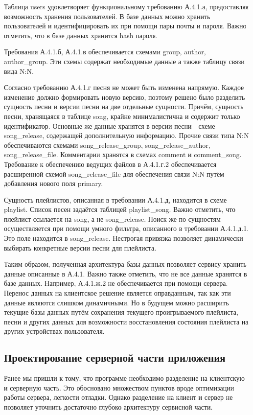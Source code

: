 \documentclass[14pt]{extarticle}
\begin{document}
Таблица users удовлетворяет функциональному требованию А.4.1.а, предоставляя возможность хранения
пользователей. В базе данных можно хранить пользователей и идентифицировать их при помощи пары
почты и пароля. Важно отметить, что в базе данных хранится hash пароля.

Требования А.4.1.б, А.4.1.в обеспечивается схемами group, author, author\_group. Эти схемы
содержат необходимые данные а также таблицу связи вида N:N. 

Согласно требованию А.4.1.г песня не может быть изменена напрямую. Каждое изменение должно формировать
новую версию, поэтому решено было разделить сущность песни и версии песни на две отдельные сущности. Причём, 
сущность песни, хранящаяся в таблице song, крайне минималистична и содержит только идентификатор. Основные 
же данные хранятся в версии песни - схеме song\_release, содержащей дополнительную информацию. Прочие связи
типа N:N обеспечиваются схемами song\_release\_group, song\_release\_author, song\_release\_file. Комментарии
хранятся в схемах comment и comment\_song. Требование к обеспечению ведущих файлов в А.4.1.г.2 обеспечивается 
расширенной схемой song\_release\_file для обеспечения связи N:N путём добавления нового поля primary.

Сущность плейлистов, описанная в требовании А.4.1.д, находится в схеме playlist. Список песен задаётся таблицей
playlist\_song. Важно отметить, что плейлист ссылается на song, а не song\_release. Поиск же по сущностям осуществляется
при помощи умного фильтра, описанного в требовании А.4.1.д.1. Это поле находится в song\_release. Нестрогая привязка
позволяет динамически выбирать конкретные версии песни для плейлиста.

Таким образом, полученная архитектура базы данных позволяет сервису хранить данные описанные в А.4.1. Важно также отметить, 
что не все данные хранятся в базе данных. Например, А.4.1.ж.2 не обеспечивается при помощи сервера. Перенос
данных на клиентское решение является оправданным, так как эти данные являются слишком динамичными. Но в будущем
можно расширить текущие базы данных путём сохранения текущего проигрываемого плейлиста, песни и других данных
для возможности восстановления состояния плейлиста на других устройствах пользователя.

\subsection{Проектирование серверной части приложения}

Ранее мы пришли к тому, что программе необходимо разделение на клиентскую и серверную часть. Это 
обосновано множеством пунктов вроде оптимизации работы сервера, легкости отладки. Однако разделение
на клиент и сервер не позволяет уточнить достаточно глубоко архитектуру сервисной части.
\end{document}
